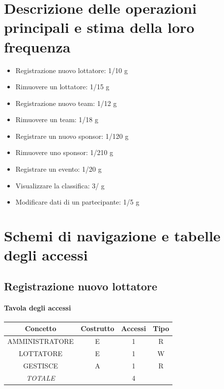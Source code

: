 \documentclass[a4paper,12pt]{report}
\begin{document}
\section{Descrizione delle operazioni principali e stima della loro frequenza}
\begin{itemize}
    \item Registrazione nuovo lottatore: 1/10 g
    \item Rimuovere un lottatore: 1/15 g
    \item Registrazione nuovo team: 1/12 g
    \item Rimuovere un team: 1/18 g
    \item Registrare un nuovo sponsor: 1/120 g
    \item Rimuovere uno sponsor: 1/210 g
    \item Registrare un evento: 1/20 g
    \item Visualizzare la classifica: 3/ g
    \item Modificare dati di un partecipante: 1/5 g
\end{itemize} 

\section{Schemi di navigazione e tabelle degli accessi}
\subsection{Registrazione nuovo lottatore}
\begin{table}[H]
    \paragraph{Tavola degli accessi\newline}
    \begin{tabular}{|c|c|c|c|}
    \hline
    Concetto          & Costrutto & Accessi & Tipo \\ \hline
    AMMINISTRATORE    & E         & 1       & R    \\ \hline
    LOTTATORE         & E         & 1       & W    \\ \hline
    GESTISCE          & A         & 1       & R    \\ \hline
    \textit{TOTALE}   &           & 4       &      \\ \hline
    \end{tabular}
\end{table}
\end{document}
